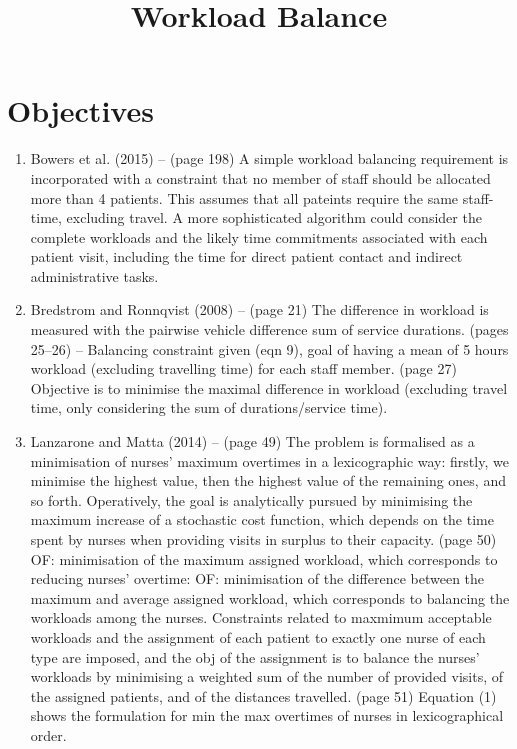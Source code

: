\documentclass[a4paper]{article}
\begin{document}
\title{Workload Balance}
\date{}
\maketitle

\section*{Objectives}
\begin{enumerate}[leftmargin=*]
	\item Bowers et al. (2015) -- (page 198) A simple workload balancing requirement is incorporated with a constraint that no member of staff should be allocated more than 4 patients. This assumes that all pateints require the same staff-time, excluding travel. A more sophisticated algorithm could consider the complete workloads and the likely time commitments associated with each patient visit, including the time for direct patient contact and indirect administrative tasks.
	\item Bredstrom and Ronnqvist (2008) -- (page 21) The difference in workload is measured with the pairwise vehicle difference sum of service durations. (pages 25--26) -- Balancing constraint given (eqn 9), goal of having a mean of 5 hours workload (excluding travelling time) for each staff member. (page 27) Objective is to minimise the maximal difference in workload (excluding travel time, only considering the sum of durations/service time).
	\item Lanzarone and Matta (2014) -- (page 49) The problem is formalised as a minimisation of nurses' maximum overtimes in a lexicographic way: firstly, we minimise the highest value, then the highest value of the remaining ones, and so forth. Operatively, the goal is analytically pursued by minimising the maximum increase of a stochastic cost function, which depends on the time spent by nurses when providing visits in surplus to their capacity. (page 50) OF: minimisation of the maximum assigned workload, which corresponds to reducing nurses' overtime: OF: minimisation of the difference between the maximum and average assigned workload, which corresponds to balancing the workloads among the nurses. Constraints related to maxmimum acceptable workloads and the assignment of each patient to exactly one nurse of each type are imposed, and the obj of the assignment is to balance the nurses' workloads by minimising a weighted sum of the number of provided visits, of the assigned patients, and of the distances travelled. (page 51) Equation (1) shows the formulation for min the max overtimes of nurses in lexicographical order.

\end{enumerate}
\end{document}
